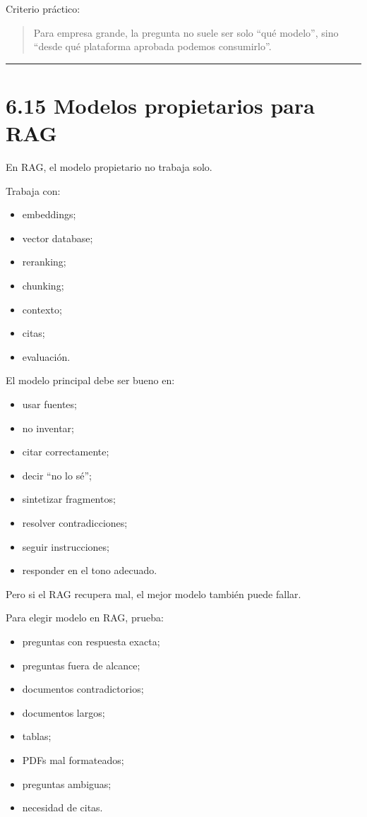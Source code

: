 Criterio práctico:

\begin{quote}
Para empresa grande, la pregunta no suele ser solo ``qué modelo'', sino
``desde qué plataforma aprobada podemos consumirlo''.
\end{quote}

\begin{center}\rule{0.5\linewidth}{0.5pt}\end{center}

\section{6.15 Modelos propietarios para
RAG}\label{modelos-propietarios-para-rag}

En RAG, el modelo propietario no trabaja solo.

Trabaja con:

\begin{itemize}
\tightlist
\item
  embeddings;
\item
  vector database;
\item
  reranking;
\item
  chunking;
\item
  contexto;
\item
  citas;
\item
  evaluación.
\end{itemize}

El modelo principal debe ser bueno en:

\begin{itemize}
\tightlist
\item
  usar fuentes;
\item
  no inventar;
\item
  citar correctamente;
\item
  decir ``no lo sé'';
\item
  sintetizar fragmentos;
\item
  resolver contradicciones;
\item
  seguir instrucciones;
\item
  responder en el tono adecuado.
\end{itemize}

Pero si el RAG recupera mal, el mejor modelo también puede fallar.

Para elegir modelo en RAG, prueba:

\begin{itemize}
\tightlist
\item
  preguntas con respuesta exacta;
\item
  preguntas fuera de alcance;
\item
  documentos contradictorios;
\item
  documentos largos;
\item
  tablas;
\item
  PDFs mal formateados;
\item
  preguntas ambiguas;
\item
  necesidad de citas.
\end{itemize}

